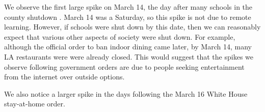 We observe the first large spike on March 14, the day after many schools in the county shutdown \cite{haire2020LA}. March 14 was a Saturday, so this spike is not due to remote learning. However, if schools were shut down by this date, then we can reasonably expect that various other aspects of society were shut down. For example, although the official order to ban indoor dining came later, by March 14, many LA restaurants were were already closed\cite{eater2020}. This would suggest that the spikes we observe following government orders are due to people seeking entertainment from the internet over outside options.

We also notice a larger spike in the days following the March 16 White House stay-at-home order. 